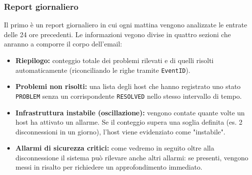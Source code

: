 \documentclass[12pt, a4paper, oneside]{report}
\begin{document}
\subsubsection{Report giornaliero}
Il primo è un report giornaliero in cui ogni mattina vengono analizzate le entrate delle 24 ore precedenti. Le informazioni vegono divise in quattro sezioni che anranno a comporre il corpo dell'email:

\begin{itemize}
    \item \textbf{Riepilogo:} conteggio totale dei problemi rilevati e di quelli risolti automaticamente
          (riconciliando le righe tramite \texttt{EventID}).
    \item \textbf{Problemi non risolti:} una lista degli host che hanno registrato uno stato
          \texttt{PROBLEM} senza un corrispondente \texttt{RESOLVED} nello stesso intervallo di tempo.
    \item \textbf{Infrastruttura instabile (oscillazione):} vengono contate quante volte un host ha attivato un allarme.
          Se il conteggio supera una soglia definita (es. 2 disconnessioni in un giorno),
          l'host viene evidenziato come "instabile".
    \item \textbf{Allarmi di sicurezza critici:} come vedremo in seguito oltre alla disconnessione il sistema può rilevare anche altri allarmi: se presenti, vengono messi in risalto per richiedere un approfondimento immediato.
\end{itemize}
\end{document}
